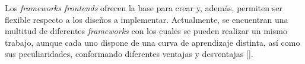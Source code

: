 


Los \textit{frameworks frontends} ofrecen la base para crear y, además, permiten ser flexible respecto a los diseños a implementar. Actualmente, se encuentran una multitud de diferentes \textit{frameworks} con los cuales se pueden realizar un mismo trabajo, aunque cada uno dispone de una curva de aprendizaje distinta, así como sus peculiaridades, conformando diferentes ventajas y desventajas [\cite{48,53}].

